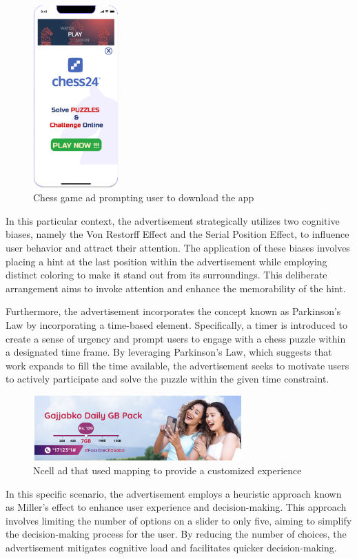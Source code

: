 \documentclass[journal]{IEEEtran}
\begin{document}
\begin{figure}[H]
    \centering
    \includegraphics[height=7cm]{HCI-CHESS3.jpg}
    \caption{Chess game ad prompting user to download the app}
\end{figure}

In this particular context, the advertisement strategically utilizes two cognitive biases,
namely the Von Restorff Effect and the Serial Position Effect, to influence user behavior
and attract their attention. The application of these biases involves placing a hint
at the last position within the advertisement while employing distinct coloring to make
it stand out from its surroundings. This deliberate arrangement aims to invoke attention
and enhance the memorability of the hint.

Furthermore, the advertisement incorporates the concept known as Parkinson's Law by
incorporating a time-based element. Specifically, a timer is introduced to create a sense
of urgency and prompt users to engage with a chess puzzle within a designated time frame.
By leveraging Parkinson's Law, which suggests that work expands to fill the time available,
the advertisement seeks to motivate users to actively participate and solve the puzzle within
the given time constraint.

\begin{figure}[H]
    \centering
    \includegraphics[width=8cm]{ncell_slide.png}
    \caption{Ncell ad that used mapping to provide a customized experience}
\end{figure}

In this specific scenario, the advertisement employs a heuristic approach known as Miller's
effect to enhance user experience and decision-making. This approach involves limiting the
number of options on a slider to only five, aiming to simplify the decision-making process
for the user. By reducing the number of choices, the advertisement mitigates cognitive load
and facilitates quicker decision-making.
\end{document}
